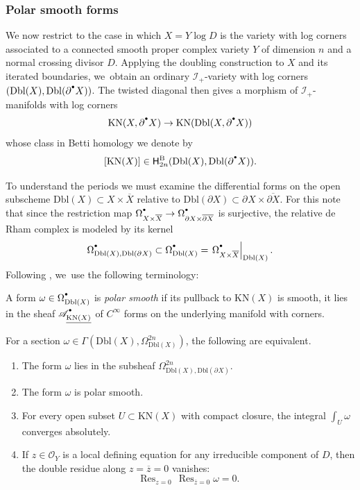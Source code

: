 \documentclass[10pt]{amsart}
\let\oldbullet\bullet
\renewcommand{\bullet}{{\raisebox{1pt}{$\scriptscriptstyle\oldbullet$}}}
\theoremstyle{definition}
\theoremstyle{remark}
\let\defn\emph
\newcommand{\zb}{\overline{z}}
\newcommand{\rbrac}[1]{\left(#1\right)}
\newcommand{\cO}[1]{\mathcal{O}_{#1}}
\newcommand{\cA}[2][\bullet]{\mathscr{A}^{#1}_{#2}}\newcommand{\A}[2][\bullet] {\mathscr{A}^{#1}\rbrac{#2}}
\DeclareMathOperator*{\res}{Res}
\newcommand{\cbdX}{\overline{\partial X}}
\newcommand{\bdX}[1][]{\partial^{#1} X}
\newcommand{\cX}{\overline{X}}
\newcommand{\KN}[1]{\mathrm{KN}(#1)}
\newcommand{\Dbl}[1]{\mathrm{Dbl}(#1)}
\newcommand{\sect}[1]{\mathsf{\Gamma}(#1)}
\newcommand{\HlgyB}[2][\bullet]{\mathsf{H}^{\mathrm{B}}_{#1}(#2)}
\newcommand{\forms}[2][\bullet]{\Omega^{#1}_{#2}}
\newcommand{\ascat}{\mathscr{I}_+}
\begin{document}
\subsubsection{Polar smooth forms}
We now restrict to the case in which $X = Y \log D$ is the variety with log corners associated to a connected smooth proper complex variety $Y$ of dimension $n$ and a normal crossing divisor $D$. Applying the doubling construction to $X$ and its iterated boundaries, we~obtain an ordinary $\ascat$-variety with log corners $(\Dbl{X},\Dbl{\partial^\bullet X})$. The twisted diagonal then gives a morphism of $\ascat$-manifolds with log corners
\[
\KN{X,\bdX[\bullet]} \to \KN{\Dbl{X,\bdX[\bullet]}}
\]
whose class in Betti homology we denote by
\[
[\KN{X}] \in \HlgyB[2n]{\Dbl{X},\Dbl{\partial^\bullet X}}.
\]

To understand the periods we must examine the differential forms on the open subscheme $\Dbl{X} \subset X\times\overline{X}$ relative to $\Dbl{\partial X} \subset \bdX\times\cbdX$. For this note that since the restriction map $\forms{X\times \cX} \to \forms{\partial X \times \overline{\partial X}}$ is surjective, the relative de Rham complex is modeled by its kernel
\[
\forms{\Dbl{X},\Dbl{\bdX}} \subset \forms{\Dbl{X}} = \left.\forms{X\times\cX}\right|_{\Dbl{X}}.
\]
Following \cite{BrownDupont}, we~use the following terminology:
\begin{definition}A form $\omega \in \forms{\Dbl{X}}$ is \defn{polar smooth} if its pullback to $\KN{X}$ is smooth, \ie it lies in the sheaf $\cA{\underline{\KN{X}}}$ of $C^\infty$ forms on the underlying manifold with corners.
\end{definition}

\begin{lemma}\label{lem:equiv}
For a section $\omega \in \sect{\Dbl{X},\forms[2n]{\Dbl{X}}}$, the following are equivalent.
\begin{enumerate}
\item\label{lem:equiv1}
The form $\omega$ lies in the subsheaf $\forms[2n]{\Dbl{X},\Dbl{\bdX}}$.
\item\label{lem:equiv2}
The form $\omega$ is polar smooth.
\item\label{lem:equiv3}
For every open subset $U \subset \KN{X}$ with compact closure, the integral $\int_U\omega$ converges absolutely.
\item\label{lem:equiv4}
If $z \in \cO{Y}$ is a local defining equation for any irreducible component of $D$, then the double residue along $z=\zb=0$ vanishes:
\[
\res_{z=0}\,\res_{\zb=0}\omega = 0.
\]
\end{enumerate}
\end{lemma}
\end{document}
